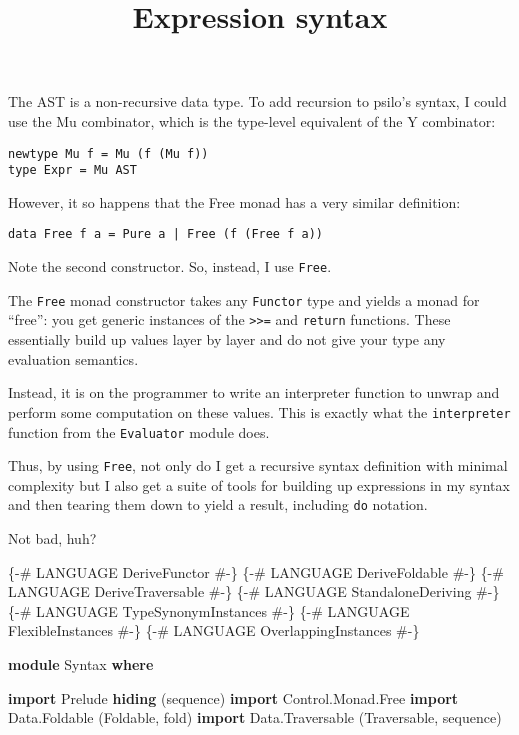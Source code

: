 \documentclass[]{article}
\title{Expression syntax}
\date{}
\newenvironment{Shaded}{}{}
\newcommand{\KeywordTok}[1]{\textcolor[rgb]{0.00,0.44,0.13}{\textbf{{#1}}}}
\newcommand{\DataTypeTok}[1]{\textcolor[rgb]{0.56,0.13,0.00}{{#1}}}
\newcommand{\OtherTok}[1]{\textcolor[rgb]{0.00,0.44,0.13}{{#1}}}
\newcommand{\NormalTok}[1]{{#1}}
\begin{document}
\maketitle

The AST is a non-recursive data type. To add recursion to psilo's
syntax, I could use the Mu combinator, which is the type-level
equivalent of the Y combinator:

\begin{verbatim}
newtype Mu f = Mu (f (Mu f))
type Expr = Mu AST
\end{verbatim}

However, it so happens that the Free monad has a very similar
definition:

\begin{verbatim}
data Free f a = Pure a | Free (f (Free f a))
\end{verbatim}

Note the second constructor. So, instead, I use \texttt{Free}.

The \texttt{Free} monad constructor takes any \texttt{Functor} type and
yields a monad for ``free'': you get generic instances of the
\texttt{\textgreater{}\textgreater{}=} and \texttt{return} functions.
These essentially build up values layer by layer and do not give your
type any evaluation semantics.

Instead, it is on the programmer to write an interpreter function to
unwrap and perform some computation on these values. This is exactly
what the \texttt{interpreter} function from the \texttt{Evaluator}
module does.

Thus, by using \texttt{Free}, not only do I get a recursive syntax
definition with minimal complexity but I also get a suite of tools for
building up expressions in my syntax and then tearing them down to yield
a result, including \texttt{do} notation.

Not bad, huh?

\begin{Shaded}
\begin{Highlighting}[]
\OtherTok{\{-# LANGUAGE DeriveFunctor #-\}}
\OtherTok{\{-# LANGUAGE DeriveFoldable #-\}}
\OtherTok{\{-# LANGUAGE DeriveTraversable #-\}}
\OtherTok{\{-# LANGUAGE StandaloneDeriving #-\}}
\OtherTok{\{-# LANGUAGE TypeSynonymInstances #-\}}
\OtherTok{\{-# LANGUAGE FlexibleInstances #-\}}
\OtherTok{\{-# LANGUAGE OverlappingInstances #-\}}

\KeywordTok{module} \DataTypeTok{Syntax} \KeywordTok{where}

\KeywordTok{import }\DataTypeTok{Prelude} \KeywordTok{hiding} \NormalTok{(sequence)}
\KeywordTok{import }\DataTypeTok{Control.Monad.Free}
\KeywordTok{import }\DataTypeTok{Data.Foldable} \NormalTok{(}\DataTypeTok{Foldable}\NormalTok{, fold)}
\KeywordTok{import }\DataTypeTok{Data.Traversable} \NormalTok{(}\DataTypeTok{Traversable}\NormalTok{, sequence)}
\end{Highlighting}
\end{Shaded}
\end{document}

